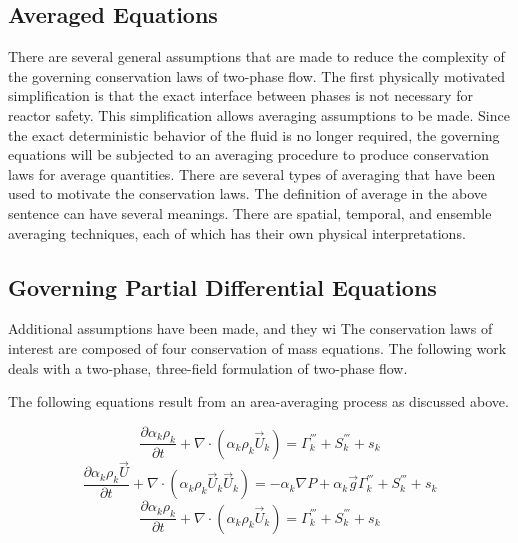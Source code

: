 \subsection{Averaged Equations}
\label{subsect:assumptions}
There are several general assumptions that are made to reduce the complexity of the governing conservation laws of two-phase flow.
The first physically motivated simplification is that the exact interface between phases is not necessary for reactor safety.
This simplification allows averaging assumptions to be made.
Since the exact deterministic behavior of the fluid is no longer required, the governing equations will be subjected to an averaging procedure to produce conservation laws for average quantities.
There are several types of averaging that have been used to motivate the conservation laws.
The definition of average in the above sentence can have several meanings.
There are spatial, temporal, and ensemble averaging techniques, each of which has their own physical interpretations\cite{Drew1998, Todreas2011}.

\subsection{Governing Partial Differential Equations}
\label{subsect:pdes}
Additional assumptions have been made, and they wi
The conservation laws of interest are composed of four conservation of mass equations.
The following work deals with a two-phase, three-field formulation of two-phase flow.

The following equations result from an area-averaging process as discussed above.

\begin{equation}
\label{eqn:conservation_of_mass}
\frac{\partial \alpha_k \rho_k }{\partial t } + \nabla \cdot \left( \alpha_k \rho_k \vec{U}_k \right) = \Gamma^{'''}_k + S^{'''}_k + s_k
\end{equation}
\begin{equation}
\label{eqn:conservation_of_momentum}
\frac{\partial \alpha_k \rho_k \vec{U} }{\partial t } + \nabla \cdot \left( \alpha_k \rho_k \vec{U}_k \vec{U}_k \right) = -\alpha_k \nabla P + \alpha_k \vec{g} \Gamma^{'''}_k + S^{'''}_k + s_k
\end{equation}
\begin{equation}
\label{eqn:conservation_of_energy}
\frac{\partial \alpha_k \rho_k }{\partial t } + \nabla \cdot \left( \alpha_k \rho_k \vec{U}_k \right) = \Gamma^{'''}_k + S^{'''}_k + s_k
\end{equation}

